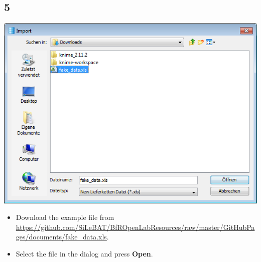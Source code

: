 \documentclass{beamer}
\begin{document}
\subsection{5}
\begin{frame}
	\begin{center}
  		\includegraphics[height=0.6\textheight]{5.png}
	\end{center}
	\begin{itemize}
		\item Download the example file from \url{https://github.com/SiLeBAT/BfROpenLabResources/raw/master/GitHubPages/documents/fake_data.xls}.
		\item Select the file in the dialog and press \textbf{Open}.
	\end{itemize}
\end{frame}
\end{document}
